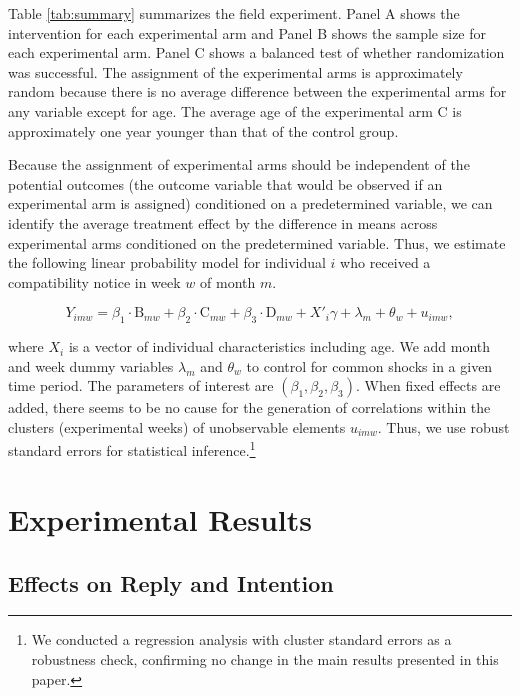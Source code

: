\documentclass[12pt, a4paper]{article}
\begin{document}
Table \ref{tab:summary} summarizes the field experiment. Panel A shows the intervention for each experimental arm and Panel B shows the sample size for each experimental arm. Panel C shows a balanced test of whether randomization was successful. The assignment of the experimental arms is approximately random because there is no average difference between the experimental arms for any variable except for age. The average age of the experimental arm C is approximately one year younger than that of the control group.

Because the assignment of experimental arms should be independent of the potential outcomes (the outcome variable that would be observed if an experimental arm is assigned) conditioned on a predetermined variable, we can identify the average treatment effect by the difference in means across experimental arms conditioned on the predetermined variable. Thus, we estimate the following linear probability model for individual \(i\) who received a compatibility notice in week \(w\) of month \(m\).

\begin{equation}
  Y_{imw} =
  \beta_1 \cdot \text{B}_{mw} + \beta_2 \cdot \text{C}_{mw} + \beta_3 \cdot \text{D}_{mw}
  + X'_i \gamma + \lambda_m + \theta_w + u_{imw}, \label{eq:reg}
\end{equation}

where \(X_i\) is a vector of individual characteristics including age. We add month and week dummy variables \(\lambda_m\) and \(\theta_w\) to control for common shocks in a given time period. The parameters of interest are \((\beta_1, \beta_2, \beta_3)\). When fixed effects are added, there seems to be no cause for the generation of correlations within the clusters (experimental weeks) of unobservable elements \(u_{imw}\). Thus, we use robust standard errors for statistical inference.\footnote{We conducted a regression analysis with cluster standard errors as a robustness check, confirming no change in the main results presented in this paper.}

\hypertarget{result}{%
\section{Experimental Results}\label{result}}

\hypertarget{intention}{%
\subsection{Effects on Reply and Intention}\label{intention}}
\end{document}
